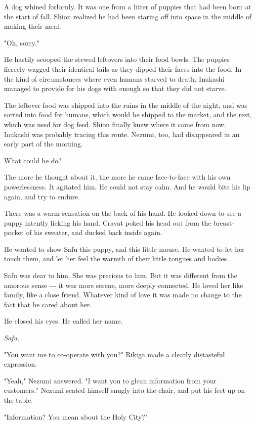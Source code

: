 A dog whined forlornly. It was one from a litter of puppies that had
been born at the start of fall. Shion realized he had been staring off
into space in the middle of making their meal.

"Oh, sorry."

He hastily scooped the stewed leftovers into their food bowls. The
puppies fiercely wagged their identical tails as they dipped their faces
into the food. In the kind of circumstances where even humans starved to
death, Inukashi managed to provide for his dogs with enough so that they
did not starve.

The leftover food was shipped into the ruins in the middle of the night,
and was sorted into food for humans, which would be shipped to the
market, and the rest, which was used for dog feed. Shion finally knew
where it came from now. Inukashi was probably tracing this route.
Nezumi, too, had disappeared in an early part of the morning.

What could he do?

The more he thought about it, the more he came face-to-face with his own
powerlessness. It agitated him. He could not stay calm. And he would
bite his lip again, and try to endure.

There was a warm sensation on the back of his hand. He looked down to
see a puppy intently licking his hand. Cravat poked his head out from
the breast-pocket of his sweater, and ducked back inside again.

He wanted to show Safu this puppy, and this little mouse. He wanted to
let her touch them, and let her feel the warmth of their little tongues
and bodies.

Safu was dear to him. She was precious to him. But it was different from
the amorous sense ― it was more serene, more deeply connected. He loved
her like family, like a close friend. Whatever kind of love it was made
no change to the fact that he cared about her.

He closed his eyes. He called her name.

\emph{Safu.}

\mybreak

"You want me to co-operate with you?" Rikiga made a clearly distasteful
expression.

"Yeah," Nezumi answered. "I want you to glean information from your
customers." Nezumi seated himself snugly into the chair, and put his
feet up on the table.

"Information? You mean about the Holy City?"

